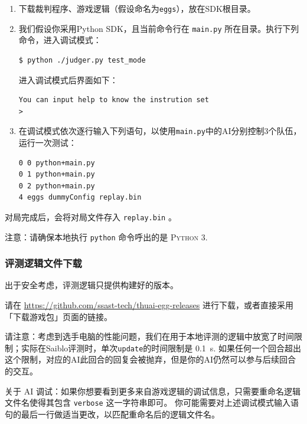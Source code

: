 \documentclass[UTF8]{article}
\begin{document}
\begin{enumerate}

\item 下载裁判程序、游戏逻辑（假设命名为\texttt{eggs}），放在SDK根目录。
\item 我们假设你采用Python SDK，且当前命令行在 \texttt{main.py} 所在目录。执行下列命令，进入调试模式：

\begin{lstlisting}[language=bash]
$ python ./judger.py test_mode
\end{lstlisting}
进入调试模式后界面如下：
\begin{lstlisting}
You can input help to know the instrution set
> 
\end{lstlisting}

\item 在调试模式依次逐行输入下列语句，以使用\texttt{main.py}中的AI分别控制3个队伍，运行一次测试：
\begin{lstlisting}
0 0 python+main.py
0 1 python+main.py
0 2 python+main.py
4 eggs dummyConfig replay.bin
\end{lstlisting}
\end{enumerate}

对局完成后，会将对局文件存入 \texttt{replay.bin} 。

注意：请确保本地执行 \texttt{python} 命令呼出的是 \textsc{Python 3}.

\hypertarget{header-n58}{%
\subsubsection{评测逻辑文件下载}\label{header-n58}}

出于安全考虑，评测逻辑只提供构建好的版本。\par 请在
\url{https://github.com/ssast-tech/thuai-egg-releases}
进行下载，或者直接采用「下载游戏包」页面的链接。

请注意：考虑到选手电脑的性能问题，我们在用于本地评测的逻辑中放宽了时间限制；实际在Saiblo评测时，单次\texttt{update}的时间限制是 \SI{0.1}{\second}. 
如果任何一个回合超出这个限制，对应的AI\color{red}此回合的回复会被抛弃\color{black}，但是你的AI\color{red}仍然可以参与后续回合的交互\color{black}。

关于 AI 调试：如果你想要看到更多来自游戏逻辑的调试信息，只需要重命名逻辑文件名使得其包含 \texttt{verbose} 这一字符串即可。
你可能需要对上述调试模式输入语句的最后一行做适当更改，以匹配重命名后的逻辑文件名。
\end{document}
